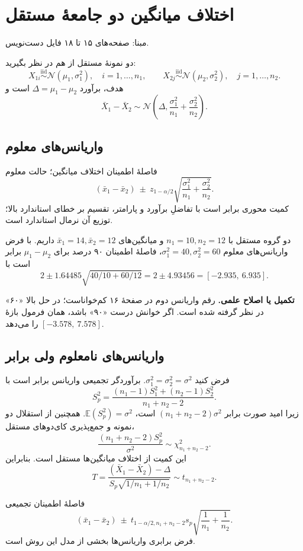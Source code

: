 \documentclass[12pt,a4paper,oneside]{report}
\newcounter{ex}[chapter]
\newenvironment{example}[1]{\refstepcounter{ex}\begin{tcolorbox}[breakable=false,title={مثال \thechapter.\arabic{ex} | #1},colframe=muted,colback=white]}{\end{tcolorbox}}
\newcommand{\edit}[1]{\par\begingroup\small\color{alert}\textbf{تکمیل یا اصلاح علمی.} #1\par\endgroup}
\newcommand{\source}[1]{\par{\small\color{muted} مبنا: صفحه‌های #1 فایل دست‌نویس.}\par}
\newcommand{\E}{\mathbb E}
\newcommand{\iid}{\overset{\mathrm{iid}}{\sim}}
\newcommand{\N}{\mathcal N}
\begin{document}
\section{اختلاف میانگین دو جامعهٔ مستقل}
\source{۱۵ تا ۱۸}
دو نمونهٔ مستقل از هم در نظر بگیرید:
\[
X_{1i}\iid\N(\mu_1,\sigma_1^2),\quad i=1,\ldots,n_1,
\qquad X_{2j}\iid\N(\mu_2,\sigma_2^2),\quad j=1,\ldots,n_2.
\]
هدف، برآورد $\Delta=\mu_1-\mu_2$ است و
\[
\bar X_1-\bar X_2\sim\N\left(\Delta,\frac{\sigma_1^2}{n_1}+\frac{\sigma_2^2}{n_2}\right).
\]
\subsection{واریانس‌های معلوم}
\begin{result}{فاصلهٔ اطمینان اختلاف میانگین؛ حالت معلوم}
\[
\boxed{(\bar x_1-\bar x_2)\ \pm\ z_{1-\alpha/2}
\sqrt{\frac{\sigma_1^2}{n_1}+\frac{\sigma_2^2}{n_2}}.}
\]
کمیت محوری برابر است با تفاضلِ برآورد و پارامتر، تقسیم بر خطای استاندارد بالا؛ توزیع آن نرمال استاندارد است.
\end{result}
\begin{example}{مقایسهٔ میانگین نمرهٔ دو گروه}
دو گروه مستقل با $n_1=10,n_2=12$ و میانگین‌های $\bar x_1=14,\bar x_2=12$ داریم. با فرض واریانس‌های معلوم $\sigma_1^2=40,\sigma_2^2=60$، فاصلهٔ اطمینان ۹۰ درصد برای $\mu_1-\mu_2$ برابر است با
\[
2\pm1.64485\sqrt{40/10+60/12}
=2\pm4.93456=\boxed{[-2.935,\ 6.935]}.
\]
\edit{رقم واریانس دوم در صفحهٔ ۱۶ کم‌خواناست؛ در حل بالا «۶۰» در نظر گرفته شده است. اگر خوانش درست «۹۰» باشد، همان فرمول بازهٔ $[-3.578,\ 7.578]$ را می‌دهد.}
\end{example}
\subsection{واریانس‌های نامعلوم ولی برابر}
فرض کنید $\sigma_1^2=\sigma_2^2=\sigma^2$. برآوردگر تجمیعی واریانس برابر است با
\[
S_p^2=\frac{(n_1-1)S_1^2+(n_2-1)S_2^2}{n_1+n_2-2}.
\]
زیرا امید صورت برابر $(n_1+n_2-2)\sigma^2$ است، $\E(S_p^2)=\sigma^2$. همچنین از استقلال دو نمونه و جمع‌پذیری کای‌دوهای مستقل،
\[
\frac{(n_1+n_2-2)S_p^2}{\sigma^2}\sim\chi^2_{n_1+n_2-2}.
\]
این کمیت از اختلاف میانگین‌ها مستقل است. بنابراین
\[
T=\frac{(\bar X_1-\bar X_2)-\Delta}
{S_p\sqrt{1/n_1+1/n_2}}\sim t_{n_1+n_2-2}.
\]
\begin{result}{فاصلهٔ اطمینان تجمیعی}
\[
\boxed{(\bar x_1-\bar x_2)\ \pm\ t_{1-\alpha/2,n_1+n_2-2}
s_p\sqrt{\frac1{n_1}+\frac1{n_2}}.}
\]
فرض برابری واریانس‌ها بخشی از مدل این روش است.
\end{result}
\end{document}

